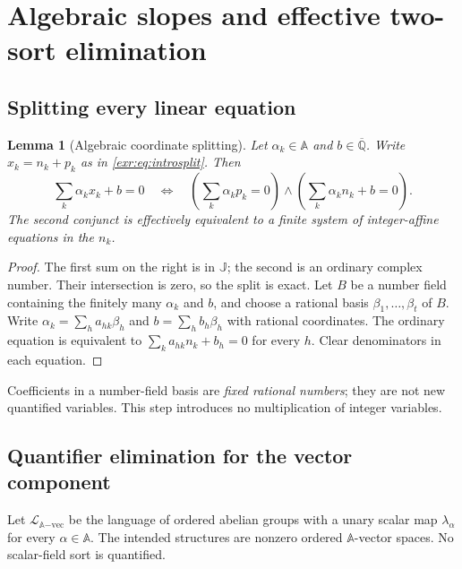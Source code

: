 \documentclass[11pt,letterpaper]{article}
\numberwithin{equation}{section}
\newtheorem{lemma}[lemma]{Lemma}
\theoremstyle{definition}
\theoremstyle{remark}
\newcommand{\A}{\mathbb A}
\newcommand{\Qb}{\overline{\mathbb Q}}
\newcommand{\J}{\mathbb J}
\newcommand{\Lvec}{\mathcal L_{\A\mathrm{-vec}}}
\begin{document}
\section{Algebraic slopes and effective two-sort elimination}\label{exr:sec:algebraic}
\subsection{Splitting every linear equation}
\begin{lemma}[Algebraic coordinate splitting]\label{exr:lem:split}
Let $\alpha_k\in\A$ and $b\in\Qb$. Write $x_k=n_k+p_k$ as in
\eqref{exr:eq:introsplit}. Then
\begin{equation}\label{exr:eq:splitlinear}
 \sum_k\alpha_kx_k+b=0
 \quad\Longleftrightarrow\quad
 \left(\sum_k\alpha_kp_k=0\right)
 \land\left(\sum_k\alpha_kn_k+b=0\right).
\end{equation}
The second conjunct is effectively equivalent to a finite system of integer-affine
equations in the $n_k$.
\end{lemma}
\begin{proof}
The first sum on the right is in $\J$; the second is an ordinary complex number.
Their intersection is zero, so the split is exact. Let $B$ be a number field
containing the finitely many $\alpha_k$ and $b$, and choose a rational basis
$\beta_1,\ldots,\beta_t$ of $B$. Write
$\alpha_k=\sum_h a_{hk}\beta_h$ and $b=\sum_h b_h\beta_h$ with rational
coordinates. The ordinary equation is equivalent to
$\sum_k a_{hk}n_k+b_h=0$ for every $h$. Clear denominators in each equation.
\end{proof}

Coefficients in a number-field basis are \emph{fixed rational numbers}; they are
not new quantified variables. This step introduces no multiplication of integer
variables.

\subsection{Quantifier elimination for the vector component}
Let $\Lvec$ be the language of ordered abelian groups with a unary scalar map
$\lambda_\alpha$ for every $\alpha\in\A$. The intended structures are nonzero
ordered $\A$-vector spaces. No scalar-field sort is quantified.
\end{document}
